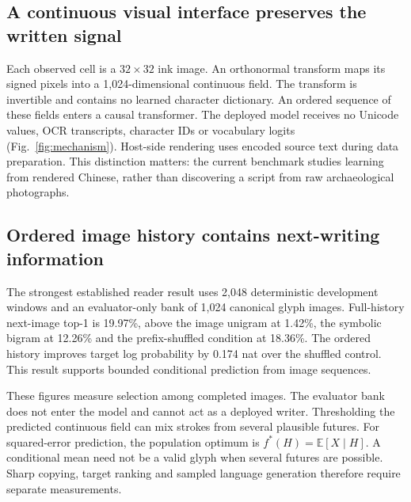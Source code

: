 \subsection*{A continuous visual interface preserves the written signal}
Each observed cell is a $32\times32$ ink image. An orthonormal transform maps
its signed pixels into a 1,024-dimensional continuous field. The transform is
invertible and contains no learned character dictionary. An ordered sequence
of these fields enters a causal transformer. The deployed model receives no
Unicode values, OCR transcripts, character IDs or vocabulary logits
(Fig.~\ref{fig:mechanism}). Host-side rendering uses encoded source text during
data preparation. This distinction matters: the current benchmark studies
learning from rendered Chinese, rather than discovering a script from raw
archaeological photographs.


\subsection*{Ordered image history contains next-writing information}
The strongest established reader result uses 2,048 deterministic development
windows and an evaluator-only bank of 1,024 canonical glyph images. Full-history
next-image top-1 is 19.97\%, above the image unigram at 1.42\%, the symbolic
bigram at 12.26\% and the prefix-shuffled condition at 18.36\%. The ordered
history improves target log probability by 0.174 nat over the shuffled control.
This result supports bounded conditional prediction from image sequences.

These figures measure selection among completed images. The evaluator bank
does not enter the model and cannot act as a deployed writer. Thresholding
the predicted continuous field can mix strokes from several plausible futures.
For squared-error prediction, the population optimum is
$f^*(H)=\mathbb{E}[X\mid H]$. A conditional mean need not be a valid glyph
when several futures are possible. Sharp copying, target ranking and sampled
language generation therefore require separate measurements.

